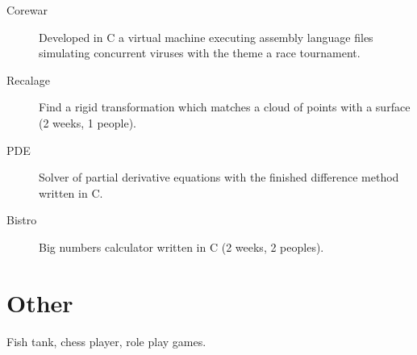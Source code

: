 \documentclass{crcv}
\begin{document}
\begin{description}
\item[\textcolor{fortitle}{Corewar}] Developed in C a virtual machine
  executing assembly language files simulating concurrent viruses with
  the theme a race tournament.
\end{description}

\begin{description}
\item[\textcolor{fortitle}{Recalage}] Find a rigid transformation
  which matches a cloud of points with a surface (2 weeks, 1 people).
\end{description}

\begin{description}
\item[\textcolor{fortitle}{PDE}] Solver of partial derivative
  equations with the finished difference method written in C.
\end{description}

\begin{description}
\item[\textcolor{fortitle}{Bistro}] Big numbers calculator written in
  C (2 weeks, 2 peoples).
\end{description}

\section{\textcolor{fortitle}{Oth}er}
Fish tank, chess player, role play games.
\end{document}

